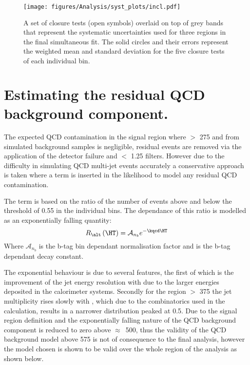 \begin{figure}[!h]
  \begin{center}
    \texttt{[image: figures/Analysis/syst\_plots/incl.pdf]}
    \caption{A set of closure tests (open symbols) overlaid on top of
      grey bands that represent the systematic uncertainties used for
      three \HT regions in the final simultaneous fit. The solid
      circles and their errors represent the weighted mean and
      standard deviation for the five closure tests of each individual
      \HT bin.}
    \label{fig:closure-summary}
  \end{center}
\end{figure}




\section{Estimating the residual QCD background 
component.} %
\label{sec:estimating_the_residual_qcd_background_component_}
The expected QCD contamination in the signal region where \HT $>$
\unit{275}{\GeV} and \altg from simulated background samples is 
negligible\cite{CMS-AN-11-517}, residual events are removed via the application 
of the detector failure and \Rmiss $<$ 1.25 filters. However due to the 
difficulty in simulating QCD multi-jet events accurately a conservative 
approach is taken where a term is inserted in the likelihood to model any 
residual QCD contamination.

The term is based on the ratio of the number of events above and below the \alt 
threshold of 0.55 in the individual \HT bins. The dependance of this ratio is 
modelled as an exponentially falling quantity:
\begin{equation}
  R_{\alt}\left(\HT\right)=\mathcal{A}_{n_{b}}e^{-\kqcd\HT}
\end{equation}
Where $\mathcal{A}_{n_{b}}$ is the b-tag bin dependant normalisation factor and 
\kqcd is the b-tag dependant decay constant.

The exponential behaviour is due to several features, the first of which is the 
improvement of the jet energy resolution with \HT due to the larger energies 
deposited in the calorimeter systems. Secondly for the region \HT $>$ 
\unit{375}{\GeV} the jet multiplicity rises slowly with \HT, which due to the 
combinatorics  used in the \alt calculation, results in a narrower \alt 
distribution peaked at 0.5. Due to the signal region definition and the 
exponentially falling nature of the QCD background component is reduced to zero 
above $\approx$~\unit{500}{\GeV}, thus the validity of the QCD background model 
above \unit{575}{\GeV} is not of consequence to the final analysis, however the 
model chosen is shown to be valid over the whole \HT region of the analysis as 
shown below.

